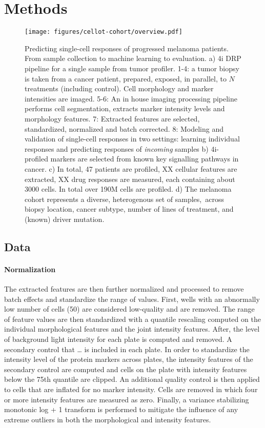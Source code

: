 \section{Methods}

\begin{figure}[h!]
  \label{cellot-cohort-overview}
  \centering
  \texttt{[image: figures/cellot-cohort/overview.pdf]}
  \caption{
    Predicting single-cell responses of progressed melanoma patients.
    From sample collection to machine learning to evaluation.
    a) 4i DRP pipeline for a single sample from tumor profiler.
    1-4: a tumor biopsy is taken from a cancer patient, prepared,
    exposed, in parallel, to $N$ treatments (including control).
    Cell morphology and marker intensities are imaged.
    5-6: An in house imaging processing pipeline performs cell segmentation,
    extracts marker intensity levels and morphology features.
    7: Extracted features are selected, standardized, normalized and batch corrected.
    8: Modeling and validation of single-cell responses in two settings: learning individual responses and predicting responses of \emph{incoming} samples
    b) 4i-profiled markers are selected from known key signalling pathways in cancer.
    c) In total, 47 patients are profiled, XX cellular features are extracted, XX drug responses are measured, each containing about 3000 cells. In total over 190M cells are profiled.
    d) The melanoma cohort represents a diverse, heterogenous set of samples,\
    across biopsy location, cancer subtype, number of lines of treatment, and (known) driver mutation.
  }
\end{figure}

\subsection{Data}

\paragraph{Normalization}
The extracted features are then further normalized and processed to remove batch effects and standardize the range of values. First, wells with an abnormally low number of cells (50) are considered low-quality and are removed. The range of feature values are then standardized with a quantile rescaling computed on the individual morphological features and the joint intensity features. After, the level of background light intensity for each plate is computed and removed. A secondary control that … is included in each plate. In order to standardize the intensity level of the protein markers across plates, the intensity features of the secondary control are computed and cells on the plate with intensity features below the 75th quantile are clipped. An additional quality control is then applied to cells that are inflated for no marker intensity. Cells are removed in which four or more intensity features are measured as zero. Finally, a variance stabilizing monotonic log + 1 transform is performed to mitigate the influence of any extreme outliers in both the morphological and intensity features.

